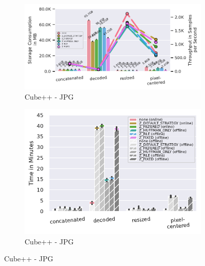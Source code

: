 \documentclass[sigconf,nonacm]{acmart}
\begin{document}
\begin{figure}[b]
  \begin{subfigure}{0.49 \columnwidth}
    \includegraphics[width=\linewidth]{../images/cubeplusplus-jpg-strategy-pipeline/compressed-storage-vs-throughput.pdf}
    \caption{Cube++ - JPG}
    \Description{}
    \label{fig:zlib-cpp-jpg-compressed-storage-vs-throughput}
  \end{subfigure}
  \hfill %
  \begin{subfigure}{0.49 \columnwidth}
    \includegraphics[width=\linewidth]{../images/cubeplusplus-jpg-strategy-pipeline/compression-processing-time-split.pdf}
    \caption{Cube++ - JPG}
    \Description{}
    \label{fig:zlib-cpp-jpg-compression-processing-time-split}
  \end{subfigure}
  

\end{figure}
\end{document}

